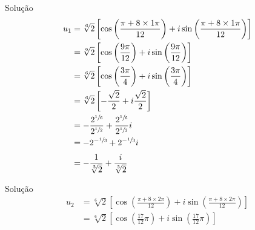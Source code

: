 \begin{resolution}{Solução}
  \begin{align*}
    u_1
    & = \sqrt[6]{2} \left[
    \cos\left( \frac{\pi + 8\times1\pi}{12} \right)
    + i \sin\left( \frac{\pi + 8\times1\pi}{12} \right)
    \right] \\
    & = \sqrt[6]{2} \left[
    \cos\left( \frac{9\pi}{12} \right)
    + i \sin\left( \frac{9\pi}{12} \right)
    \right] \\
    & = \sqrt[6]{2} \left[
    \cos\left( \frac{3\pi}{4} \right)
    + i \sin\left( \frac{3\pi}{4} \right)
    \right] \\
    & = \sqrt[6]{2} \left[
    - \frac{\sqrt{2}}{2}
    + i \frac{\sqrt{2}}{2}
    \right] \\
    & = - \frac{2^{\sfrac{1}{6}}}{2^{\sfrac{1}{2}}}
    + \frac{2^{\sfrac{1}{6}}}{2^{\sfrac{1}{2}}} i  \\
    & = - 2^{-\sfrac{1}{3}}
    + 2^{-\sfrac{1}{3}} i \\[2mm]
    & = - \frac{1}{\sqrt[3]{2}}
    + \frac{i}{\sqrt[3]{2}}
  \end{align*}
\end{resolution}

\begin{resolution}{Solução}
  \begin{align*}
    u_2
    & = \sqrt[6]{2} \left[
    \cos\left( \frac{\pi + 8\times2\pi}{12} \right)
    + i \sin\left( \frac{\pi + 8\times2\pi}{12} \right)
    \right] \\
    & = \sqrt[6]{2} \left[
    \cos\left( \frac{17}{12}\pi \right)
    + i \sin\left( \frac{17}{12}\pi \right)
    \right]
  \end{align*}
\end{resolution}

